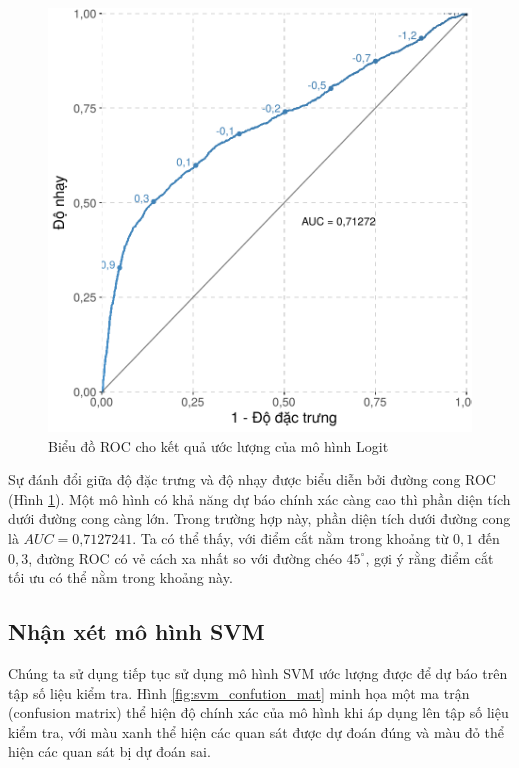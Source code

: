 \documentclass[a4paper]{report}\usepackage[]{graphicx}\usepackage[]{color}
\newenvironment{knitrout}{}{} %
\begin{document}
\begin{figure}[h]
\centering
\capstart
\begin{knitrout}\small
{}\color{fgcolor}
\includegraphics[width=12cm]{Figures/lasso_roc-1} 

\end{knitrout}
\caption{Biểu đồ ROC cho kết quả ước lượng của mô hình Logit}
\label{fig:lasso_roc}
\end{figure}

Sự đánh đổi giữa độ đặc trưng và độ nhạy được biểu diễn bởi đường cong ROC (Hình \ref{fig:lasso_roc}). Một mô hình có khả năng dự báo chính xác càng cao thì phần diện tích dưới đường cong càng lớn. Trong trường hợp này, phần diện tích dưới đường cong là $AUC = \text{0,7127241}$. Ta có thể thấy, với điểm cắt nằm trong khoảng từ $0,1$ đến $0,3$, đường ROC có vẻ cách xa nhất so với đường chéo $45^\circ$, gợi ý rằng điểm cắt tối ưu có thể nằm trong khoảng này.


\subsection{Nhận xét mô hình SVM}
Chúng ta sử dụng tiếp tục sử dụng mô hình SVM ước lượng được để dự báo trên tập số liệu kiểm tra. Hình \ref{fig:svm_confution_mat} minh họa một ma trận (confusion matrix) thể hiện độ chính xác của mô hình khi áp dụng lên tập số liệu kiểm tra, với màu xanh thể hiện các quan sát được dự đoán đúng và màu đỏ thể hiện các quan sát bị dự đoán sai.
\end{document}
